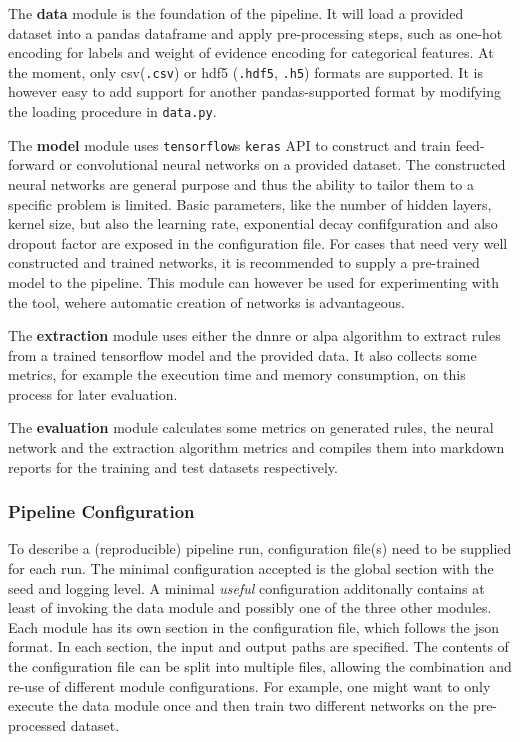 \documentclass[
]{article}
\begin{document}
The \textbf{data} module is the foundation of the pipeline. It will load
a provided dataset into a pandas dataframe and apply pre-processing
steps, such as one-hot encoding for labels and weight of evidence
encoding for categorical features. At the moment, only
csv(\texttt{.csv}) or hdf5 (\texttt{.hdf5}, \texttt{.h5}) formats are
supported. It is however easy to add support for another
pandas-supported format by modifying the loading procedure in
\texttt{data.py}.

The \textbf{model} module uses \texttt{tensorflow}s \texttt{keras} API
to construct and train feed-forward or convolutional neural networks on
a provided dataset. The constructed neural networks are general purpose
and thus the ability to tailor them to a specific problem is limited.
Basic parameters, like the number of hidden layers, kernel size, but
also the learning rate, exponential decay confifguration and also
dropout factor are exposed in the configuration file. For cases that
need very well constructed and trained networks, it is recommended to
supply a pre-trained model to the pipeline. This module can however be
used for experimenting with the tool, wehere automatic creation of
networks is advantageous.

The \textbf{extraction} module uses either the dnnre or alpa algorithm
to extract rules from a trained tensorflow model and the provided data.
It also collects some metrics, for example the execution time and memory
consumption, on this process for later evaluation.

The \textbf{evaluation} module calculates some metrics on generated
rules, the neural network and the extraction algorithm metrics and
compiles them into markdown reports for the training and test datasets
respectively.

\hypertarget{pipeline-configuration}{%
\subsubsection{Pipeline Configuration}\label{pipeline-configuration}}

To describe a (reproducible) pipeline run, configuration file(s) need to
be supplied for each run. The minimal configuration accepted is the
global section with the seed and logging level. A minimal \emph{useful}
configuration additonally contains at least of invoking the data module
and possibly one of the three other modules. Each module has its own
section in the configuration file, which follows the json format. In
each section, the input and output paths are specified. The contents of
the configuration file can be split into multiple files, allowing the
combination and re-use of different module configurations. For example,
one might want to only execute the data module once and then train two
different networks on the pre-processed dataset.
\end{document}
